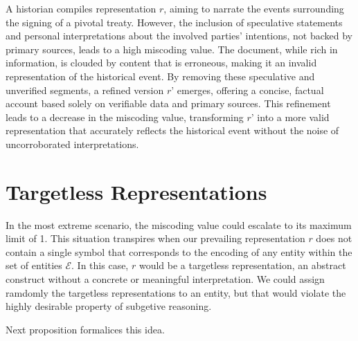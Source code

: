 \begin{example}
A historian compiles representation $r$, aiming to narrate the events surrounding the signing of a pivotal treaty. However, the inclusion of speculative statements and personal interpretations about the involved parties’ intentions, not backed by primary sources, leads to a high miscoding value. The document, while rich in information, is clouded by content that is erroneous, making it an invalid representation of the historical event. By removing these speculative and unverified segments, a refined version $r’$ emerges, offering a concise, factual account based solely on verifiable data and primary sources. This refinement leads to a decrease in the miscoding value, transforming $r’$ into a more valid representation that accurately reflects the historical event without the noise of uncorroborated interpretations.
\end{example}

%
%

\section{Targetless Representations}

In the most extreme scenario, the miscoding value could escalate to its maximum limit of 1. This situation transpires when our prevailing representation $r$ does not contain a single symbol that corresponds to the encoding of any entity within the set of entities $\mathcal{E}$. In this case, $r$ would be a targetless representation, an abstract construct without a concrete or meaningful interpretation. We could assign ramdomly the targetless representations to an entity, but that would violate the highly desirable property of subgetive reasoning.

Next proposition formalices this idea.

